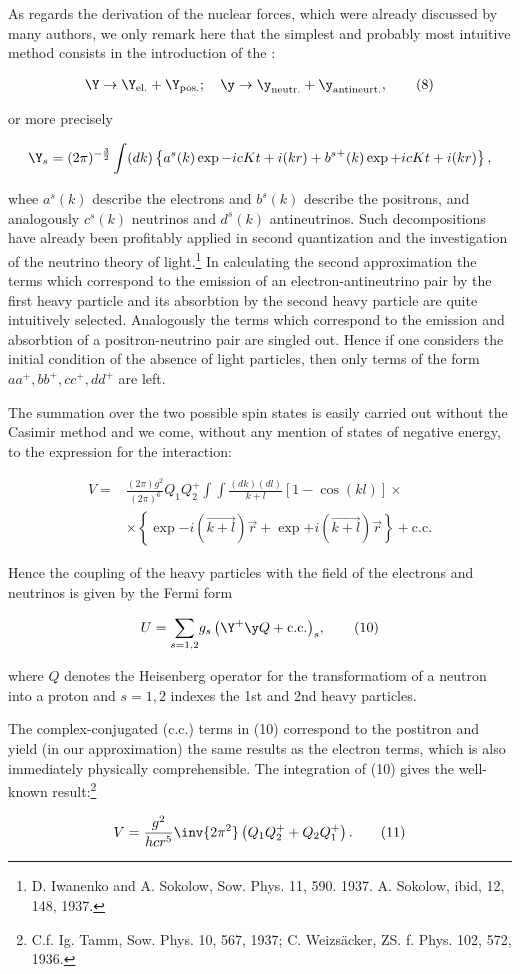 \documentclass{article}
\newcommand{\nequ}[2]{
\begin{align*}
#1
\tag{#2}
\end{align*}
}
\newcommand{\uequ}[1]{
\begin{align*}
#1
\end{align*}
}
\newcommand{\sumX}[1]{\underset{#1}{\sum}}
\begin{document}
As regards the derivation of the nuclear forces, which were already discussed by many authors, we only remark here that the simplest and probably most intuitive method consists in the introduction of the :
\nequ{
\Y \to \Y_\text{el.} + \Y_\text{pos.}; \quad
\y \to \y_\text{neutr.} + \y_\text{antineurt.},
}{8}
or more precisely
\uequ{
\Y_s = (2\pi)^{-\frac{3}{2}}\int({dk})\left\{
a^s(k)\exp{-icKt + i(kr)} + {b^s}^+(k)\exp{+icKt + i(kr)}
\right\},
}
whee $a^s(k)$ describe the electrons and $b^s(k)$ describe the positrons, and analogously $c^s(k)$ neutrinos and $d^s(k)$ antineutrinos. Such decompositions have already been profitably applied in second quantization and the investigation of the neutrino theory of light.\footnote{D. Iwanenko and A. Sokolow, Sow. Phys. 11, 590. 1937. A. Sokolow, ibid, 12, 148, 1937.} In calculating the second approximation the terms which correspond to the emission of an electron-antineutrino pair by the first heavy particle and its absorbtion by the second heavy particle are quite intuitively selected. Analogously the terms which correspond to the emission and absorbtion of a positron-neutrino pair are singled out. Hence if one considers the initial condition of the absence of light particles, then only terms of the form $aa^+, bb^+, cc^+, dd^+$ are left.

The summation over the two possible spin states is easily carried out without the Casimir method and we come, without any mention of states of negative energy, to the expression for the interaction:
\uequ{
V = &\frac{(2\pi)g^2}{(2\pi)^6}Q_1 Q_2^+ \int\int\frac{({dk})({dl})}{k+l}\left[
1 - \cos{(kl)}\right]\times\\
&\times \left\{
\exp{-i(\overrightarrow{k+l})\vec{r}} + \exp{+i(\overrightarrow{k+l})\vec{r}}
\right\} + \text{c.c.} 
}
Hence the coupling of the heavy particles with the field of the electrons and neutrinos is given by the Fermi form
\nequ{
U=\sumX{s=1,2}{g_s\left(\Y^+\y Q + \text{c.c.}\right)_s},
}{10}
where $Q$ denotes the Heisenberg operator for the transformatiom of a neutron into a proton and $s=1,2$ indexes the 1st and 2nd heavy particles.

The complex-conjugated (c.c.) terms in (10) correspond to the postitron  and yield (in our approximation) the same results as the electron terms, which is also immediately physically comprehensible. The integration of (10) gives the well-known result:\footnote{C.f. Ig. Tamm, Sow. Phys. 10, 567, 1937; C. Weizs\"acker, ZS. f. Phys. 102, 572, 1936.}
\nequ{
V=\frac{g^2}{hcr^5}\inv{2\pi^2}\left(Q_1 Q_2^+ + Q_2 Q_1^+\right).
}{11}
\end{document}

